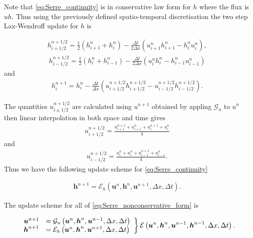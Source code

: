\documentclass[SingleSpace,12pt,Proceedings]{Serre_ASCE}
\begin{document}
Note that \eqref{eq:Serre_continuity} is in conservative law form for $h$ where the flux is $uh$. Thus using the previously defined spatio-temporal discretisation the two step Lax-Wendroff update for $h$ is
\begin{linenomath*}
\begin{gather}
h^{n + 1/2}_{i+ 1/2} = \frac{1}{2}\left(h^{n}_{i+1} + h^{n}_i\right) - \frac{\Delta t}{2\Delta x}\left(u^n_{i+1}h^n_{i+1} - h^n_{i}u^n_{i}\right),
\end{gather}
\begin{gather}
h^{n + 1/2}_{i- 1/2} = \frac{1}{2}\left(h^{n}_{i} + h^{n}_{i-1}\right) - \frac{\Delta t}{2\Delta x}\left(u^n_{i}h^n_{i} - h^n_{i-1}u^n_{i-1}\right)
\end{gather}
and
\begin{gather}
h^{n+1}_i = h^{n}_i - \frac{\Delta t}{\Delta x}\left(u^{n + 1/2}_{i+ 1/2}h^{n + 1/2}_{i+ 1/2} - u^{n + 1/2}_{i- 1/2}h^{n + 1/2}_{i- 1/2}\right).
\label{eq:LW4h}
\end{gather}
\end{linenomath*}
The quantities $u^{n + 1/2}_{i \pm 1/2}$ are calculated using $u^{n+1}$ obtained by appling $\mathcal{G}_u$ to $u^n$ then linear interpolation in both space and time gives
\begin{gather}
u^{n + 1/2}_{i+ 1/2} = \frac{u^{n+1}_{i+1} + u^{n}_{i+1} + u^{n+1}_{i} + u^{n}_{i} }{4}
\end{gather}
and
\begin{gather}
u^{n + 1/2}_{i- 1/2} = \frac{u^{n}_{i} + u^{n}_{i} + u^{n+1}_{i-1}+ u^{n}_{i-1} }{4}.
\end{gather}
Thus we have the following update scheme for \eqref{eq:Serre_continuity}
\begin{linenomath*}
	\begin{gather}
	\boldsymbol{h}^{n+1} = \mathcal{E}_h\left(\boldsymbol{u}^n,\boldsymbol{h}^n,\boldsymbol{u}^{n+1}, \Delta x, \Delta t \right). 
	\end{gather}
\end{linenomath*}
The update scheme for all of \eqref{eq:Serre_nonconservative_form} is
\begin{linenomath*}
\begin{gather}
	\left.
	\begin{array}{l l}
	\boldsymbol{u}^{n+1}&=\mathcal{G}_u\left(\boldsymbol{u}^n,\boldsymbol{h}^n, \boldsymbol{u}^{n-1}, \Delta x, \Delta t \right) \\
	\boldsymbol{h}^{n+1}&=\mathcal{E}_h\left(\boldsymbol{u}^n,\boldsymbol{h}^n,\boldsymbol{u}^{n+1}, \Delta x, \Delta t \right)
	\end{array} \right\rbrace \mathcal{E}\left(\boldsymbol{u}^n,\boldsymbol{h}^n, \boldsymbol{u}^{n-1},\boldsymbol{h}^{n-1}, \Delta x, \Delta t \right).
\end{gather}
\end{linenomath*}
\end{document}
